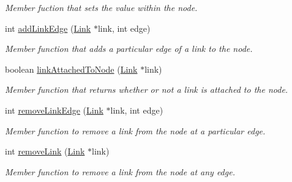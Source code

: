 \begin{DoxyCompactItemize}
\begin{DoxyCompactList}\small\item\em Member fuction that sets the value within the node. \end{DoxyCompactList}\item 
\hypertarget{classNode_ac757cd0455bc4a34e36669c13bed7935}{int \hyperlink{classNode_ac757cd0455bc4a34e36669c13bed7935}{add\-Link\-Edge} (\hyperlink{classLink}{Link} $\ast$link, int edge)}\label{classNode_ac757cd0455bc4a34e36669c13bed7935}

\begin{DoxyCompactList}\small\item\em Member function that adds a particular edge of a link to the node. \end{DoxyCompactList}\item 
\hypertarget{classNode_ae071717ba42566e4ce15a1fc7e04fb43}{boolean \hyperlink{classNode_ae071717ba42566e4ce15a1fc7e04fb43}{link\-Attached\-To\-Node} (\hyperlink{classLink}{Link} $\ast$link)}\label{classNode_ae071717ba42566e4ce15a1fc7e04fb43}

\begin{DoxyCompactList}\small\item\em Member function that returns whether or not a link is attached to the node. \end{DoxyCompactList}\item 
\hypertarget{classNode_a0b5614c3ffee7bcdf4f4582a27aee16d}{int \hyperlink{classNode_a0b5614c3ffee7bcdf4f4582a27aee16d}{remove\-Link\-Edge} (\hyperlink{classLink}{Link} $\ast$link, int edge)}\label{classNode_a0b5614c3ffee7bcdf4f4582a27aee16d}

\begin{DoxyCompactList}\small\item\em Member function to remove a link from the node at a particular edge. \end{DoxyCompactList}\item 
\hypertarget{classNode_a255a6bebb84adfb6668207a53095d983}{int \hyperlink{classNode_a255a6bebb84adfb6668207a53095d983}{remove\-Link} (\hyperlink{classLink}{Link} $\ast$link)}\label{classNode_a255a6bebb84adfb6668207a53095d983}

\begin{DoxyCompactList}\small\item\em Member function to remove a link from the node at any edge. \end{DoxyCompactList}\end{DoxyCompactItemize}
